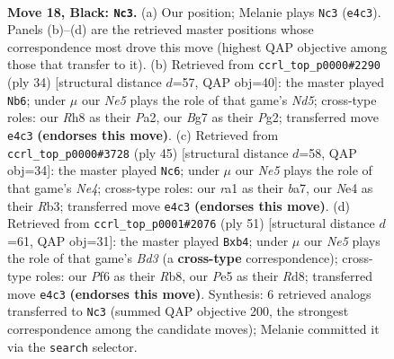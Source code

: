 \documentclass[11pt]{article}
\begin{document}
\clearpage

\begin{figure}[p]\centering
\begin{subfigure}{0.46\textwidth}\centering
\resizebox{\linewidth}{!}{%
\newchessgame
\chessboard[
  setfen={rk5r/pp4bp/5p2/4pP2/PPP1n3/8/5P2/R1B1KB1R b KQ - 0 18},
  showmover=false,
  pgfstyle=straightmove, color=movearrow, markmove={e4-c3}
]}
\caption{}
\end{subfigure}\hfill
\begin{subfigure}{0.46\textwidth}\centering
\resizebox{\linewidth}{!}{%
\newchessgame
\chessboard[
  setfen={2rk1br1/1p1bpp1p/p2p4/3N4/4RP2/5B2/PPP3PP/1K5R w - - 1 18},
  showmover=false,
  pgfstyle=straightmove, color=movearrow, markmove={d5-b6}
]}
\caption{}
\end{subfigure}
\\[4pt]
\begin{subfigure}{0.46\textwidth}\centering
\resizebox{\linewidth}{!}{%
\newchessgame
\chessboard[
  setfen={5rk1/B4pbp/6p1/4n3/1p2P3/1r3P2/3RBKPP/7R b - - 0 23},
  showmover=false,
  pgfstyle=straightmove, color=movearrow, markmove={e5-c6}
]}
\caption{}
\end{subfigure}\hfill
\begin{subfigure}{0.46\textwidth}\centering
\resizebox{\linewidth}{!}{%
\newchessgame
\chessboard[
  setfen={1r1r2k1/1p3ppp/1N1b1n2/8/1P6/4P3/R3BPPP/2R3K1 b - - 0 26},
  showmover=false,
  pgfstyle=straightmove, color=movearrow, markmove={d6-b4}
]}
\caption{}
\end{subfigure}
\caption{\textbf{Move 18, Black: \texttt{Nc3}.} (a) Our position; Melanie plays \texttt{Nc3} (\texttt{e4c3}). Panels (b)--(d) are the retrieved master positions whose correspondence most drove this move (highest QAP objective among those that transfer to it). (b) Retrieved from \texttt{ccrl\_top\_p0000\#2290} (ply 34) [structural distance $d$=57, QAP obj=40]: the master played \texttt{Nb6}; under $\mu$ our \emph{Ne5} plays the role of that game's \emph{Nd5}; cross-type roles: our \emph{R}h8 as their \emph{P}a2, our \emph{B}g7 as their \emph{P}g2; transferred move \texttt{e4c3} \textbf{(endorses this move)}. (c) Retrieved from \texttt{ccrl\_top\_p0000\#3728} (ply 45) [structural distance $d$=58, QAP obj=34]: the master played \texttt{Nc6}; under $\mu$ our \emph{Ne5} plays the role of that game's \emph{Ne4}; cross-type roles: our \emph{r}a1 as their \emph{b}a7, our \emph{N}e4 as their \emph{R}b3; transferred move \texttt{e4c3} \textbf{(endorses this move)}. (d) Retrieved from \texttt{ccrl\_top\_p0001\#2076} (ply 51) [structural distance $d$=61, QAP obj=31]: the master played \texttt{Bxb4}; under $\mu$ our \emph{Ne5} plays the role of that game's \emph{Bd3} (a \textbf{cross-type} correspondence); cross-type roles: our \emph{P}f6 as their \emph{R}b8, our \emph{P}e5 as their \emph{R}d8; transferred move \texttt{e4c3} \textbf{(endorses this move)}. Synthesis: 6 retrieved analogs transferred to \texttt{Nc3} (summed QAP objective 200, the strongest correspondence among the candidate moves); Melanie committed it via the \texttt{search} selector.}
\label{fig:thought-m35}
\end{figure}
\end{document}
